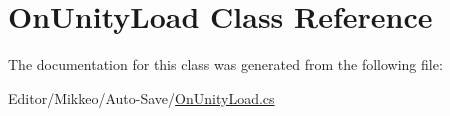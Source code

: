 \hypertarget{class_on_unity_load}{}\section{On\+Unity\+Load Class Reference}
\label{class_on_unity_load}


The documentation for this class was generated from the following file\+:\begin{DoxyCompactItemize}
\item 
Editor/\+Mikkeo/\+Auto-\/\+Save/\hyperlink{_on_unity_load_8cs}{On\+Unity\+Load.\+cs}\end{DoxyCompactItemize}
